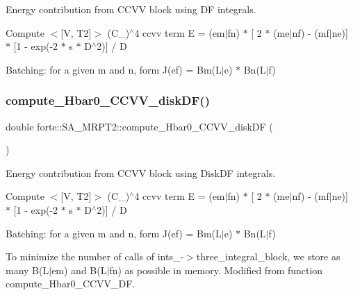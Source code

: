 Energy contribution from C\+C\+VV block using DF integrals. 

Compute $<$\mbox{[}V, T2\mbox{]}$>$ (C\+\_)$^\wedge$4 ccvv term E = (em$\vert$fn) $\ast$ \mbox{[} 2 $\ast$ (me$\vert$nf) -\/ (mf$\vert$ne)\mbox{]} $\ast$ \mbox{[}1 -\/ exp(-\/2 $\ast$ s $\ast$ D$^\wedge$2)\mbox{]} / D

Batching\+: for a given m and n, form J(ef) = Bm(L$\vert$e) $\ast$ Bn(L$\vert$f)\mbox{\label{classforte_1_1_s_a___m_r_p_t2_a2589c3f7a1ba682ede3ce1e4251503af}} 
\subsubsection{\texorpdfstring{compute\+\_\+\+Hbar0\+\_\+\+C\+C\+V\+V\+\_\+disk\+D\+F()}{compute\_Hbar0\_CCVV\_diskDF()}}
{\footnotesize\ttfamily double forte\+::\+S\+A\+\_\+\+M\+R\+P\+T2\+::compute\+\_\+\+Hbar0\+\_\+\+C\+C\+V\+V\+\_\+disk\+DF (\begin{DoxyParamCaption}{ }\end{DoxyParamCaption})\hspace{0.3cm}{\ttfamily [protected]}}



Energy contribution from C\+C\+VV block using Disk\+DF integrals. 

Compute $<$\mbox{[}V, T2\mbox{]}$>$ (C\+\_)$^\wedge$4 ccvv term E = (em$\vert$fn) $\ast$ \mbox{[} 2 $\ast$ (me$\vert$nf) -\/ (mf$\vert$ne)\mbox{]} $\ast$ \mbox{[}1 -\/ exp(-\/2 $\ast$ s $\ast$ D$^\wedge$2)\mbox{]} / D

Batching\+: for a given m and n, form J(ef) = Bm(L$\vert$e) $\ast$ Bn(L$\vert$f)

To minimize the number of calls of ints\+\_\+-\/$>$three\+\_\+integral\+\_\+block, we store as many B(L$\vert$em) and B(L$\vert$fn) as possible in memory. Modified from function compute\+\_\+\+Hbar0\+\_\+\+C\+C\+V\+V\+\_\+\+DF.\mbox{\label{classforte_1_1_s_a___m_r_p_t2_a085abee58e89aa1ee5bb3c74938ec129}} 
